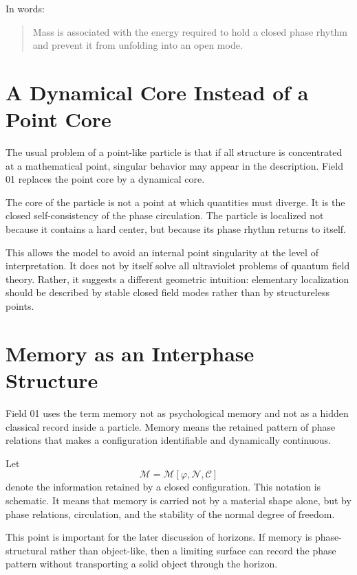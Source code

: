 \documentclass[11pt,a4paper]{article}
\newcommand{\phase}{\varphi}
\newcommand{\normal}{\mathcal{N}}
\newcommand{\memory}{\mathcal{M}}
\newcommand{\contour}{\mathcal{C}}
\begin{document}
In words:
\begin{quote}
Mass is associated with the energy required to hold a closed phase rhythm and prevent it from unfolding into an open mode.
\end{quote}

\section{A Dynamical Core Instead of a Point Core}

The usual problem of a point-like particle is that if all structure is concentrated at a mathematical point, singular behavior may appear in the description. Field 01 replaces the point core by a dynamical core.

The core of the particle is not a point at which quantities must diverge. It is the closed self-consistency of the phase circulation. The particle is localized not because it contains a hard center, but because its phase rhythm returns to itself.

This allows the model to avoid an internal point singularity at the level of interpretation. It does not by itself solve all ultraviolet problems of quantum field theory. Rather, it suggests a different geometric intuition: elementary localization should be described by stable closed field modes rather than by structureless points.

\section{Memory as an Interphase Structure}

Field 01 uses the term memory not as psychological memory and not as a hidden classical record inside a particle. Memory means the retained pattern of phase relations that makes a configuration identifiable and dynamically continuous.

Let
\begin{equation}
\memory = \memory[\phase,\normal,\contour]
\end{equation}
denote the information retained by a closed configuration. This notation is schematic. It means that memory is carried not by a material shape alone, but by phase relations, circulation, and the stability of the normal degree of freedom.

This point is important for the later discussion of horizons. If memory is phase-structural rather than object-like, then a limiting surface can record the phase pattern without transporting a solid object through the horizon.
\end{document}

